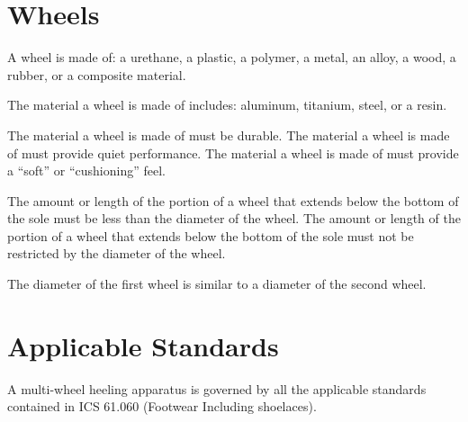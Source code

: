 \documentclass[
  draft,
]{tech-spec}
\begin{document}
  \section*{Wheels}
  \begin{parnumbers}
    A wheel is made of: a urethane, a plastic, a polymer, a metal, an alloy, a wood, a rubber, or a composite material.

    The material a wheel is made of includes: aluminum, titanium, steel, or a resin.

    The material a wheel is made of must be durable. The material a wheel is made of must provide quiet performance. The material a wheel is made of must provide a “soft” or “cushioning” feel.

    The amount or length of the portion of a wheel that extends below the bottom of the sole must be less than the diameter of the wheel. The amount or length of the portion of a wheel that extends below the bottom of the sole must not be restricted by the diameter of the wheel.

    The diameter of the first wheel is similar to a diameter of the second wheel.
  \end{parnumbers}

  \section*{Applicable Standards}
  \begin{parnumbers}
    A multi-wheel heeling apparatus is governed by all the applicable standards contained in ICS 61.060 (Footwear Including shoelaces).
  \end{parnumbers}
\end{document}
